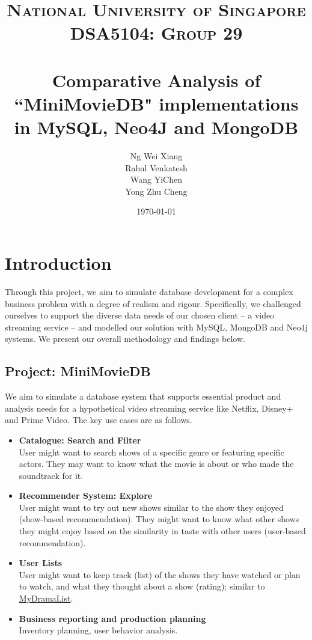 \documentclass[10pt,titlepage]{article}
\title{
    \textsc{\LARGE National University of Singapore}\\[1cm]
    \textsc{\Large DSA5104: Group 29}\\[2cm]


    \HRule\\[0.4cm]
    \huge{Comparative Analysis of ``MiniMovieDB" implementations in MySQL, Neo4J and MongoDB}
    \HRule\\[1.5cm]
}
\author{\begin{tabular}{rl}
        Ng Wei Xiang & \\
        Rahul Venkatesh & \\
        Wang YiChen & \\
        Yong Zhu Cheng & 
\end{tabular}}
\date{\vfill\today}
\begin{document}
\maketitle
\tableofcontents
\pagebreak

\section{Introduction}
Through this project, we aim to simulate database development for a complex business problem with a degree of realism
and rigour. Specifically, we challenged ourselves to support the diverse data needs of our chosen client -- a video
streaming service -- and modelled our solution with MySQL, MongoDB and Neo4j systems. We present our overall methodology
and findings below.

\subsection{Project: MiniMovieDB}

We aim to simulate a database system that supports essential product and analysis needs for a hypothetical video
streaming service like Netflix, Disney+ and Prime Video. The key use cases are as follows.

\begin{itemize}
    \item \textbf{Catalogue: Search and Filter} \\
        User might want to search shows of a specific genre or featuring specific actors. They may want to know what the
        movie is about or who made the soundtrack for it.
    \item \textbf{Recommender System: Explore} \\
        User might want to try out new shows similar to the show they enjoyed (show-based recommendation). They might
        want to know what other shows they might enjoy based on the similarity in taste with other users (user-based
        recommendation).
    \item \textbf{User Lists} \\
        User might want to keep track (list) of the shows they have watched or plan to watch, and what they thought
        about a show (rating); similar to \href{https://mydramalist.com/}{MyDramaList}.
    \item \textbf{Business reporting and production planning} \\
        Inventory planning, user behavior analysis.
\end{itemize}
\end{document}
